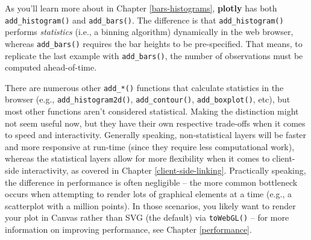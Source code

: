 \documentclass[
  12pt,
]{krantz}
\newenvironment{Shaded}{\begin{snugshade}}{\end{snugshade}}
\newcommand{\DataTypeTok}[1]{\textcolor[rgb]{0.13,0.29,0.53}{#1}}
\newcommand{\KeywordTok}[1]{\textcolor[rgb]{0.13,0.29,0.53}{\textbf{#1}}}
\newcommand{\NormalTok}[1]{#1}
\newcommand{\OperatorTok}[1]{\textcolor[rgb]{0.81,0.36,0.00}{\textbf{#1}}}
\newcommand{\StringTok}[1]{\textcolor[rgb]{0.31,0.60,0.02}{#1}}
\begin{document}
\begin{Shaded}
\end{Shaded}

As you'll learn more about in Chapter \ref{bars-histograms}, \textbf{plotly} has both \texttt{add\_histogram()} and \texttt{add\_bars()}. The difference is that \texttt{add\_histogram()} performs \emph{statistics} (i.e., a binning algorithm) dynamically in the web browser, whereas \texttt{add\_bars()} requires the bar heights to be pre-specified. That means, to replicate the last example with \texttt{add\_bars()}, the number of observations must be computed ahead-of-time.

\begin{Shaded}
\end{Shaded}

There are numerous other \texttt{add\_*()} functions that calculate statistics in the browser (e.g., \texttt{add\_histogram2d()}, \texttt{add\_contour()}, \texttt{add\_boxplot()}, etc), but most other functions aren't considered statistical. Making the distinction might not seem useful now, but they have their own respective trade-offs when it comes to speed and interactivity. Generally speaking, non-statistical layers will be faster and more responsive at run-time (since they require less computational work), whereas the statistical layers allow for more flexibility when it comes to client-side interactivity, as covered in Chapter \ref{client-side-linking}. Practically speaking, the difference in performance is often negligible -- the more common bottleneck occurs when attempting to render lots of graphical elements at a time (e.g., a scatterplot with a million points). In those scenarios, you likely want to render your plot in Canvas rather than SVG (the default) via \texttt{toWebGL()} -- for more information on improving performance, see Chapter \ref{performance}.
\end{document}
